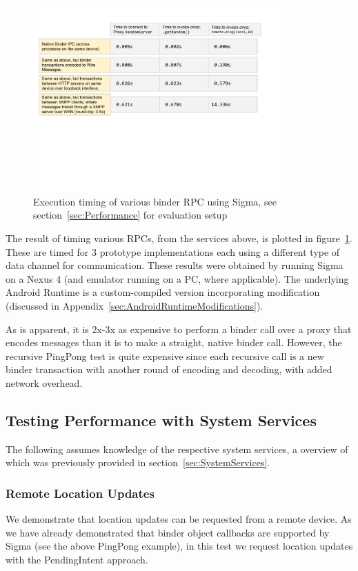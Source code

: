 \documentclass[prodmode]{acmlarge}
\begin{document}
\begin{figure}[h]
\centering
\includegraphics[width=0.85\textwidth]{drawings/Performance.pdf}
\caption{Execution timing of various binder RPC using Sigma, see section~\ref{sec:Performance} for evaluation setup}
\label{fig:performance}
\end{figure}

The result of timing various RPCs, from the services above, is plotted in figure~\ref{fig:performance}. These are timed for 3 prototype implementations each using a different type of data channel for communication. These results were obtained by running Sigma on a Nexus 4 (and emulator running on a PC, where applicable). The underlying Android Runtime is a custom-compiled version incorporating modification (discussed in Appendix~\ref{sec:AndroidRuntimeModifications}).

As is apparent, it is 2x-3x as expensive to perform a binder call over a proxy that encodes messages than it is to make a straight, native binder call. However, the recursive PingPong test is quite expensive since each recursive call is a new binder transaction with another round of encoding and decoding, with added network overhead.

\subsection{Testing Performance with System Services}

The following assumes knowledge of the respective system services, a overview of which was previously provided in section~\ref{sec:SystemServices}.

\subsubsection{Remote Location Updates}
\label{sec:location_sharing}
We demonstrate that location updates can be requested from a remote device. As we have already demonstrated that binder object callbacks are supported by Sigma (see the above PingPong example), in this test we request location updates with the PendingIntent approach.
\end{document}

